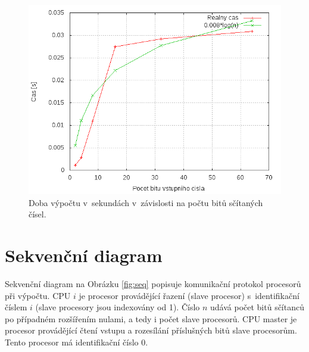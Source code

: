 \documentclass[a4paper, 12pt]{article}
\begin{document}
\begin{figure}[bt]
\begin{center}
    \includegraphics[scale=0.5]{perf.png}
    \caption{Doba výpočtu v~sekundách v~závislosti na počtu bitů sčítaných čísel.}
    \label{fig:res}
\end{center}
\end{figure}

\section{Sekvenční diagram}
\label{sec:seq}
Sekvenční diagram na Obrázku \ref{fig:seq} popisuje komunikační protokol procesorů
při výpočtu.
CPU $i$ je procesor provádějící řazení (slave procesor) s~identifikační
číslem $i$ (slave procesory jsou indexovány od 1).
Číslo $n$ udává počet bitů sčítanců po případném rozšířením nulami, a tedy
i počet slave procesorů.
CPU master je procesor provádějící čtení vstupu a rozesílání příslušných bitů slave procesorům.
Tento procesor má identifikační číslo $0$.
\end{document}
